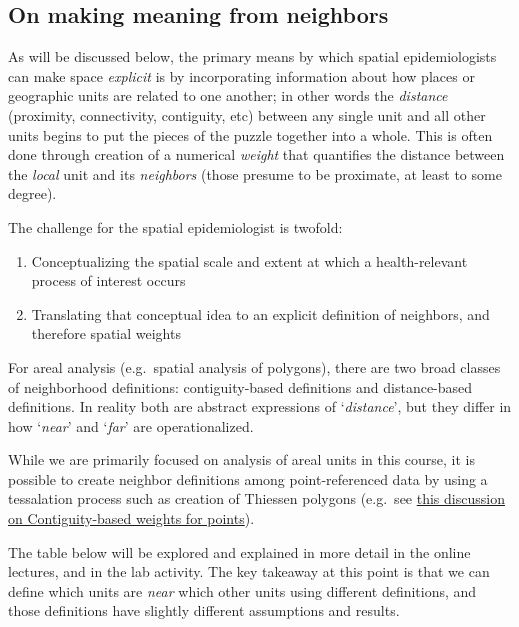 \documentclass[
]{book}
\providecommand{\tightlist}{%
  \setlength{\itemsep}{0pt}\setlength{\parskip}{0pt}}
\newenvironment{rmdcaution}[1]
  {
  \begin{itemize}
  \renewcommand{\labelitemi}{
    \raisebox{-.7\height}[0pt][0pt]{
      {\setkeys{Gin}{width=3em,keepaspectratio}\texttt{[image: images/\#1]}}
    }
  }
  \setlength{\fboxsep}{1em}
  \begin{caution}
  \item
  }
  {
  \end{caution}
  \end{itemize}
  }
\begin{document}
\hypertarget{on-making-meaning-from-neighbors}{%
\subsection{On making meaning from neighbors}\label{on-making-meaning-from-neighbors}}

As will be discussed below, the primary means by which spatial epidemiologists can make space \emph{explicit} is by incorporating information about how places or geographic units are related to one another; in other words the \emph{distance} (proximity, connectivity, contiguity, etc) between any single unit and all other units begins to put the pieces of the puzzle together into a whole. This is often done through creation of a numerical \emph{weight} that quantifies the distance between the \emph{local} unit and its \emph{neighbors} (those presume to be proximate, at least to some degree).

The challenge for the spatial epidemiologist is twofold:

\begin{enumerate}
\def\labelenumi{\arabic{enumi}.}
\tightlist
\item
  Conceptualizing the spatial scale and extent at which a health-relevant process of interest occurs
\item
  Translating that conceptual idea to an explicit definition of neighbors, and therefore spatial weights
\end{enumerate}

For areal analysis (e.g.~spatial analysis of polygons), there are two broad classes of neighborhood definitions: contiguity-based definitions and distance-based definitions. In reality both are abstract expressions of `\emph{distance}', but they differ in how `\emph{near}' and `\emph{far}' are operationalized.

While we are primarily focused on analysis of areal units in this course, it is possible to create neighbor definitions among point-referenced data by using a tessalation process such as creation of Thiessen polygons (e.g.~see \href{https://geodacenter.github.io/workbook/4b_dist_weights/lab4b.html\#distance-metric}{this discussion on Contiguity-based weights for points}).

\begin{rmdcaution}{caution}
The table below will be explored and explained in more detail in the online lectures, and in the lab activity. The key takeaway at this point is that we can define which units are \emph{near} which other units using different definitions, and those definitions have slightly different assumptions and results.

\end{rmdcaution}
\end{document}
